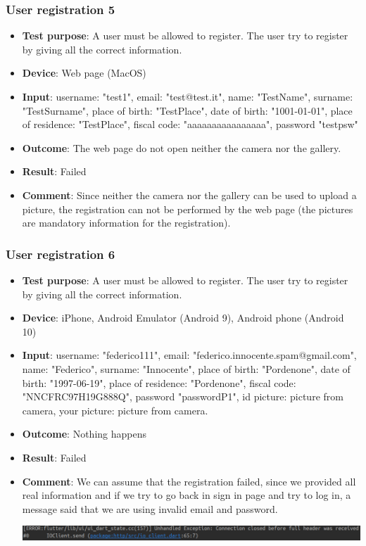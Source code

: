 \documentclass[../ATD.tex]{subfiles}
\begin{document}
    \subsubsection{User registration 5}\label{subsubsec:user-registration-5}
    \begin{itemize}
        \item \textbf{Test purpose}: A user must be allowed to register.
        The user try to register by giving all the correct information.
        \item \textbf{Device}: Web page (MacOS)
        \item \textbf{Input}: username: "test1", email: "test@test.it", name: "TestName", surname: "TestSurname", place of birth: "TestPlace", date of birth: "1001-01-01", place of residence: "TestPlace", fiscal code: "aaaaaaaaaaaaaaaa", password "testpsw"
        \item \textbf{Outcome}: The web page do not open neither the camera nor the gallery.
        \item \textbf{Result}: Failed
        \item \textbf{Comment}: Since neither the camera nor the gallery can be used to upload a picture, the registration can not be performed by the web page (the pictures are mandatory information for the registration).
    \end{itemize}

    \subsubsection{User registration 6}\label{subsubsec:user-registration-6}
    \begin{itemize}
        \item \textbf{Test purpose}: A user must be allowed to register.
        The user try to register by giving all the correct information.
        \item \textbf{Device}: iPhone, Android Emulator (Android 9), Android phone (Android 10)
        \item \textbf{Input}: username: "federico111", email: "federico.innocente.spam@gmail.com", name: "Federico", surname: "Innocente", place of birth: "Pordenone", date of birth: "1997-06-19", place of residence: "Pordenone", fiscal code: "NNCFRC97H19G888Q", password "passwordP1", id picture: picture from camera, your picture: picture from camera.
        \item \textbf{Outcome}: Nothing happens
        \item \textbf{Result}: Failed
        \item \textbf{Comment}: We can assume that the registration failed, since we provided all real information and if we try to go back in sign in page and try to log in,
        a message said that we are using invalid email and password.

        \includegraphics[scale = 0.3]{assets/statsError.png}
    \end{itemize}
\end{document}
